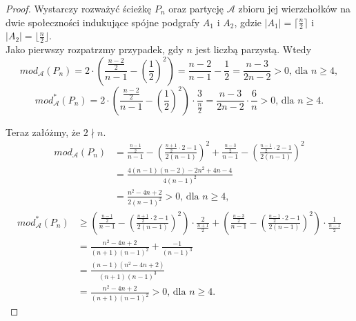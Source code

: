 \documentclass[letterpaper,12pt]{article}
\begin{document}
\begin{proof}
  Wystarczy rozważyć ścieżkę \(P_n\) oraz partycję \(\mathcal{A}\) zbioru jej wierzchołków na dwie społeczności indukujące spójne podgrafy \(A_1\) i \(A_2\), gdzie \(|A_1| = \lceil\frac{n}{2}\rceil\) i \(|A_2| = \lfloor\frac{n}{2}\rfloor\).\\

  Jako pierwszy rozpatrzmy przypadek, gdy \(n\) jest liczbą parzystą. Wtedy
  \[mod_{\mathcal{A}}(P_n) = 2\cdot\left(\frac{\frac{n-2}{2}}{n-1} - {\left(\frac{1}{2}\right)}^2\right) = \frac{n-2}{n-1}-\frac{1}{2}=\frac{n-3}{2n-2}>0 \text{, dla } n \geq 4,\]
  \[mod_{\mathcal{A}}^*(P_n) = 2\cdot\left(\frac{\frac{n-2}{2}}{n-1} - {\left(\frac{1}{2}\right)}^2\right) \cdot \frac{3}{\frac{n}{2}}=\frac{n-3}{2n-2} \cdot \frac{6}{n} > 0\text{, dla } n \geq 4.\]

  Teraz załóżmy, że \(2\nmid n\).
  \begin{align*}
    mod_{\mathcal{A}}(P_n) & = \frac{\frac{n-1}{2}}{n-1} - {\left(\frac{\frac{n+1}{2}\cdot 2-1}{2(n-1)}\right)}^2 + \frac{\frac{n-3}{2}}{n-1} - {\left(\frac{\frac{n-1}{2}\cdot 2-1}{2(n-1)}\right)}^2 \\
                           & = \frac{4(n-1)(n-2)-2n^2+4n-4}{4(n-1)^2}                                                                                                                                  \\
                           & = \frac{n^2-4n+2}{2(n-1)^2}>0 \text{, dla } n \geq 4,
  \end{align*}
  \begin{align*}
    mod_{\mathcal{A}}^*(P_n) & \geq \left(\frac{\frac{n-1}{2}}{n-1} - {\left(\frac{\frac{n+1}{2}\cdot 2-1}{2(n-1)}\right)}^2\right) \cdot \frac{2}{\frac{n+1}{2}} + \left(\frac{\frac{n-3}{2}}{n-1} - {\left(\frac{\frac{n-1}{2}\cdot 2-1}{2(n-1)}\right)}^2\right) \cdot \frac{1}{\frac{n-1}{2}} \\
                             & = \frac{n^2-4n+2}{(n+1)(n-1)^2} + \frac{-1}{(n-1)^3}                                                                                                                                                                                                               \\
                             & = \frac{(n-1)(n^2-4n+2)}{(n+1)(n-1)^3}                                                                                                                                                                                                                             \\
                             & = \frac{n^2-4n+2}{(n+1)(n-1)^2}>0 \text{, dla } n \geq 4.
  \end{align*}
\end{proof}
\end{document}
